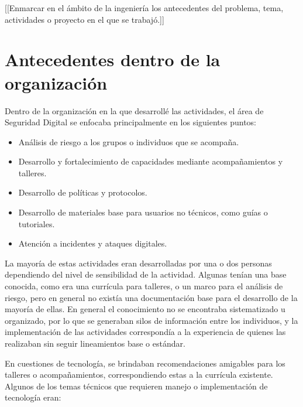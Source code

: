 \documentclass[12pt]{caltech_thesis}
\begin{document}
[[Enmarcar en el ámbito de la ingeniería los antecedentes del problema, tema, actividades o proyecto en el que se trabajó.]]

\section{Antecedentes dentro de la organización}

Dentro de la organización en la que desarrollé las actividades, el área de Seguridad Digital se enfocaba principalmente en los siguientes puntos:

\begin{itemize}
    \item Análisis de riesgo a los grupos o individuos que se acompaña.
    \item Desarrollo y fortalecimiento de capacidades mediante acompañamientos y talleres.
    \item Desarrollo de políticas y protocolos.
    \item Desarrollo de materiales base para usuarios no técnicos, como guías o tutoriales.
    \item Atención a incidentes y ataques digitales.
\end{itemize}

La mayoría de estas actividades eran desarrolladas por una o dos personas dependiendo del nivel de sensibilidad de la actividad. Algunas tenían una base conocida, como era una currícula para talleres, o un marco para el análisis de riesgo, pero en general no existía una documentación base para el desarrollo de la mayoría de ellas. En general el conocimiento no se encontraba sistematizado u organizado, por lo que se generaban silos de información entre los individuos, y la implementación de las actividades correspondía a la experiencia de quienes las realizaban sin seguir lineamientos base o estándar.

En cuestiones de tecnología, se brindaban recomendaciones amigables para los talleres o acompañamientos, correspondiendo estas a la currícula existente. Algunos de los temas técnicos que requieren manejo o implementación de tecnología eran:
\end{document}
